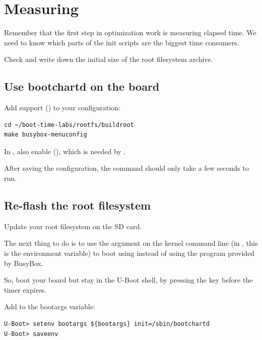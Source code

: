 
\section{Measuring}

Remember that the first step in optimization work is measuring elapsed
time. We need to know which parts of the init scripts are the biggest
time consumers.

Check and write down the initial size of the root filesystem archive.

\subsection{Use bootchartd on the board}

Add  support ()
to your  configuration:

\begin{verbatim}
cd ~/boot-time-labs/rootfs/buildroot
make busybox-menuconfig
\end{verbatim}

In , also enable  (), which is needed by
.

After saving the configuration, the  command should only take
a few seconds to run.

\subsection{Re-flash the root filesystem}

Update your root filesystem on the SD card.

The next thing to do is to use the  argument on the
kernel command line (in , this is the 
environment variable) to boot using  instead of using
the  program provided by BusyBox.

So, boot your board but stay in the U-Boot shell, by pressing the
 key before the timer expires.

Add  to the bootargs variable:
\begin{verbatim}
U-Boot> setenv bootargs ${bootargs} init=/sbin/bootchartd
U-Boot> saveenv
\end{verbatim}

